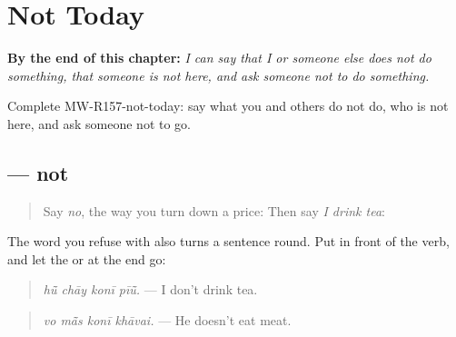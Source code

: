 
\chapter{Not Today}
\label{ch:mw-a2-not-today}

\begin{chapteropening}
\textbf{By the end of this chapter:} \emph{I can say that I or someone else does not do something, that someone is not here, and ask someone not to do something.}

Complete MW-R157-not-today: say what you and others do not do, who is not here, and ask someone not to go.
\end{chapteropening}

\section[\texorpdfstring{\mw{कोनी} (konī)}{कोनी (konī)}]{ — not}

\label{lesson:MW-C157-koni}



\begin{quote}
Say \emph{no}, the way you turn down a price: \textbf{} Then say \emph{I drink tea}: \textbf{   }
\end{quote}

\begin{grammarlens}[title={Grammar Lens: \mw{कोनी} before the verb}]
The word you refuse with also turns a sentence round. Put \textbf{} in front of the verb, and let the \textbf{} or \textbf{} at the end go:

\begin{quote}
\textbf{   }
\end{quote}

\begin{quote}
\emph{hū̃ chāy konī pīū̃.} — I don't drink tea.
\end{quote}

\begin{quote}
\textbf{   }
\end{quote}

\begin{quote}
\emph{vo mā̃s konī khāvai.} — He doesn't eat meat.
\end{quote}
\end{grammarlens}

